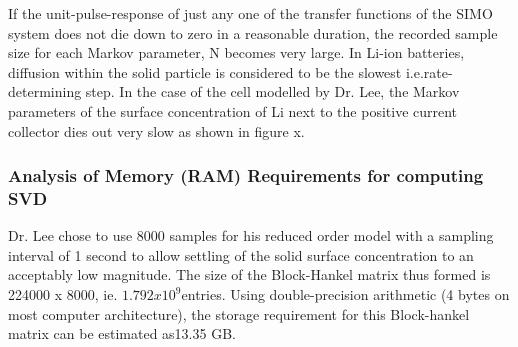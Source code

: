 If the unit-pulse-response of just any one of the transfer functions
of the SIMO system does not die down to zero in a reasonable duration,
the recorded sample size for each Markov parameter, N becomes very
large. In Li-ion batteries, diffusion within the solid particle is
considered to be the slowest i.e.rate-determining step. In the case
of the cell modelled by Dr. Lee, the Markov parameters of the surface
concentration of Li next to the positive current collector dies out
very slow as shown in figure x.

\subsubsection*{Analysis of Memory (RAM) Requirements for computing SVD}

Dr. Lee chose to use 8000 samples for his reduced order model with
a sampling interval of 1 second to allow settling of the solid surface
concentration to an acceptably low magnitude. The size of the Block-Hankel
matrix thus formed is 224000 x 8000, ie. $1.792x10^{9}$entries. Using double-precision arithmetic
(4 bytes on most computer architecture), the storage requirement for
this Block-hankel matrix can be estimated as13.35 GB.

